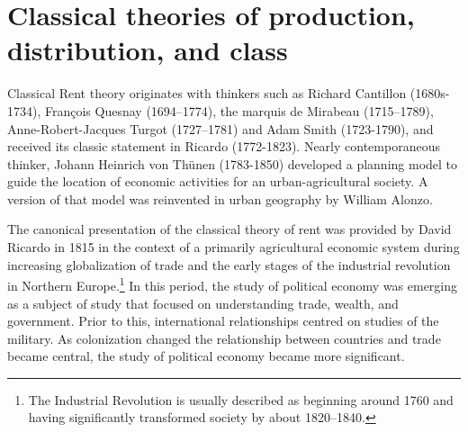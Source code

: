 
\section{Classical theories of production, distribution, and class}
Classical Rent theory originates with  thinkers such as Richard Cantillon (1680s-1734), Fran\c{c}ois
Quesnay (1694–1774), the marquis de Mirabeau (1715–1789), Anne-Robert-Jacques
Turgot (1727--1781) and Adam Smith (1723-1790), and received its classic statement
in Ricardo (1772-1823). Nearly contemporaneous thinker, Johann Heinrich von Th\"unen (1783-1850) developed a planning model to guide the location of economic activities for an urban-agricultural
society. A version of that model was reinvented in urban geography by William Alonzo.

The canonical presentation of the classical theory of rent \cite{ricardoEssayInfluenceLow1815} was provided  by David Ricardo in 1815 in the context of a primarily agricultural economic system during increasing globalization of trade and  the early stages of the industrial revolution in Northern Europe.\footnote{The Industrial Revolution is usually described as beginning around 1760 and having significantly transformed society by about 1820–1840.} In this period, the study of \gls{political economy} was emerging as a subject of study that focused on understanding trade, wealth, and government. Prior to this, international relationships centred on studies of the military. As colonization changed the relationship between countries and trade became central, the study of \gls{political economy} became more significant. 

